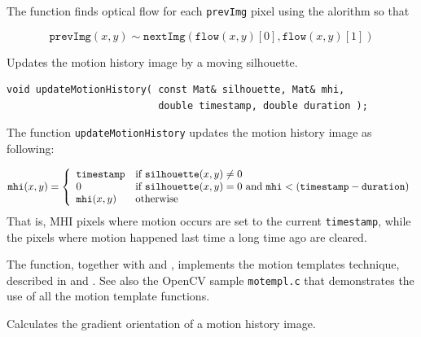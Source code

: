 The function finds optical flow for each \texttt{prevImg} pixel using the alorithm so that

\[\texttt{prevImg}(x,y) \sim \texttt{nextImg}(\texttt{flow}(x,y)[0], \texttt{flow}(x,y)[1])\]


\label{updateMotionHistory}
Updates the motion history image by a moving silhouette.

\begin{lstlisting}
void updateMotionHistory( const Mat& silhouette, Mat& mhi,
                          double timestamp, double duration );
\end{lstlisting}
\begin{description}
\end{description}

The function \texttt{updateMotionHistory} updates the motion history image as following:

\[
\texttt{mhi}(x,y)=\left\{ \begin{array}{l l} \texttt{timestamp} & \mbox{if $\texttt{silhouette}(x,y) \ne 0$}\\ 0 & \mbox{if $\texttt{silhouette}(x,y) = 0$ and $\texttt{mhi} < (\texttt{timestamp} - \texttt{duration})$}\\ \texttt{mhi}(x,y) & \mbox{otherwise}\\ \end{array} \right.
\]
That is, MHI pixels where motion occurs are set to the current \texttt{timestamp}, while the pixels where motion happened last time a long time ago are cleared.

The function, together with  and , implements the motion templates technique, described in \cite{Davis97} and \cite{Bradski00}.
See also the OpenCV sample \texttt{motempl.c} that demonstrates the use of all the motion template functions.

\label{calcMotionGradient}
Calculates the gradient orientation of a motion history image.

